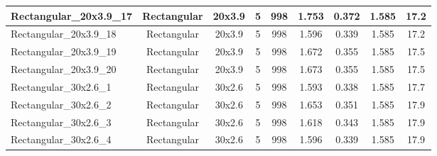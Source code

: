\begin{table}
\begin{adjustbox}{max width = \linewidth}
\begin{tabular}{lcccccccc}
\multicolumn{1}{|l|}{Rectangular\_20x3.9\_17} & \multicolumn{1}{c|}{Rectangular} & \multicolumn{1}{c|}{20x3.9} & \multicolumn{1}{c|}{5} & \multicolumn{1}{c|}{998} & \multicolumn{1}{c|}{1.753} & \multicolumn{1}{c|}{0.372} & \multicolumn{1}{c|}{1.585} & \multicolumn{1}{c|}{17.2} \\ \hline
\multicolumn{1}{|l|}{Rectangular\_20x3.9\_18} & \multicolumn{1}{c|}{Rectangular} & \multicolumn{1}{c|}{20x3.9} & \multicolumn{1}{c|}{5} & \multicolumn{1}{c|}{998} & \multicolumn{1}{c|}{1.596} & \multicolumn{1}{c|}{0.339} & \multicolumn{1}{c|}{1.585} & \multicolumn{1}{c|}{17.2} \\ \hline
\multicolumn{1}{|l|}{Rectangular\_20x3.9\_19} & \multicolumn{1}{c|}{Rectangular} & \multicolumn{1}{c|}{20x3.9} & \multicolumn{1}{c|}{5} & \multicolumn{1}{c|}{998} & \multicolumn{1}{c|}{1.672} & \multicolumn{1}{c|}{0.355} & \multicolumn{1}{c|}{1.585} & \multicolumn{1}{c|}{17.5} \\ \hline
\multicolumn{1}{|l|}{Rectangular\_20x3.9\_20} & \multicolumn{1}{c|}{Rectangular} & \multicolumn{1}{c|}{20x3.9} & \multicolumn{1}{c|}{5} & \multicolumn{1}{c|}{998} & \multicolumn{1}{c|}{1.673} & \multicolumn{1}{c|}{0.355} & \multicolumn{1}{c|}{1.585} & \multicolumn{1}{c|}{17.5} \\ \hline
\multicolumn{1}{|l|}{Rectangular\_30x2.6\_1} & \multicolumn{1}{c|}{Rectangular} & \multicolumn{1}{c|}{30x2.6} & \multicolumn{1}{c|}{5} & \multicolumn{1}{c|}{998} & \multicolumn{1}{c|}{1.593} & \multicolumn{1}{c|}{0.338} & \multicolumn{1}{c|}{1.585} & \multicolumn{1}{c|}{17.7} \\ \hline
\multicolumn{1}{|l|}{Rectangular\_30x2.6\_2} & \multicolumn{1}{c|}{Rectangular} & \multicolumn{1}{c|}{30x2.6} & \multicolumn{1}{c|}{5} & \multicolumn{1}{c|}{998} & \multicolumn{1}{c|}{1.653} & \multicolumn{1}{c|}{0.351} & \multicolumn{1}{c|}{1.585} & \multicolumn{1}{c|}{17.9} \\ \hline
\multicolumn{1}{|l|}{Rectangular\_30x2.6\_3} & \multicolumn{1}{c|}{Rectangular} & \multicolumn{1}{c|}{30x2.6} & \multicolumn{1}{c|}{5} & \multicolumn{1}{c|}{998} & \multicolumn{1}{c|}{1.618} & \multicolumn{1}{c|}{0.343} & \multicolumn{1}{c|}{1.585} & \multicolumn{1}{c|}{17.9} \\ \hline
\multicolumn{1}{|l|}{Rectangular\_30x2.6\_4} & \multicolumn{1}{c|}{Rectangular} & \multicolumn{1}{c|}{30x2.6} & \multicolumn{1}{c|}{5} & \multicolumn{1}{c|}{998} & \multicolumn{1}{c|}{1.596} & \multicolumn{1}{c|}{0.339} & \multicolumn{1}{c|}{1.585} & \multicolumn{1}{c|}{17.9} \\ \hline

\end{tabular}
\end{adjustbox}
\end{table}
